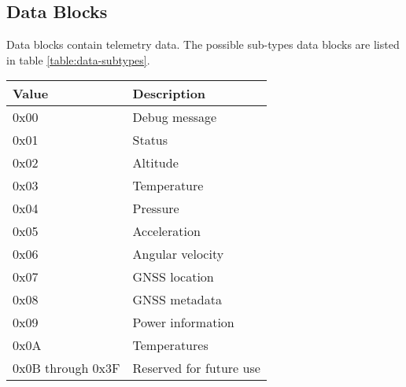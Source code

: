 \subsection{Data Blocks}

Data blocks contain telemetry data. The possible sub-types data blocks are listed in table \ref{table:data-subtypes}.

\begin{table*}[htb]
    \centering
    \begin{tabular}{@{}ll@{}}
        \toprule
        Value             & Description             \\
        \midrule
        0x00              & Debug message           \\
        0x01              & Status                  \\
        0x02              & Altitude                \\
        0x03              & Temperature             \\
        0x04              & Pressure                \\
        0x05              & Acceleration            \\
        0x06              & Angular velocity        \\
        0x07              & GNSS location           \\
        0x08              & GNSS metadata           \\
        0x09              & Power information       \\
        0x0A              & Temperatures            \\
        0x0B through 0x3F & Reserved for future use \\
        \bottomrule
    \end{tabular}
    \caption{Data Block Subtypes}
    \label{table:data-subtypes}
\end{table*}










